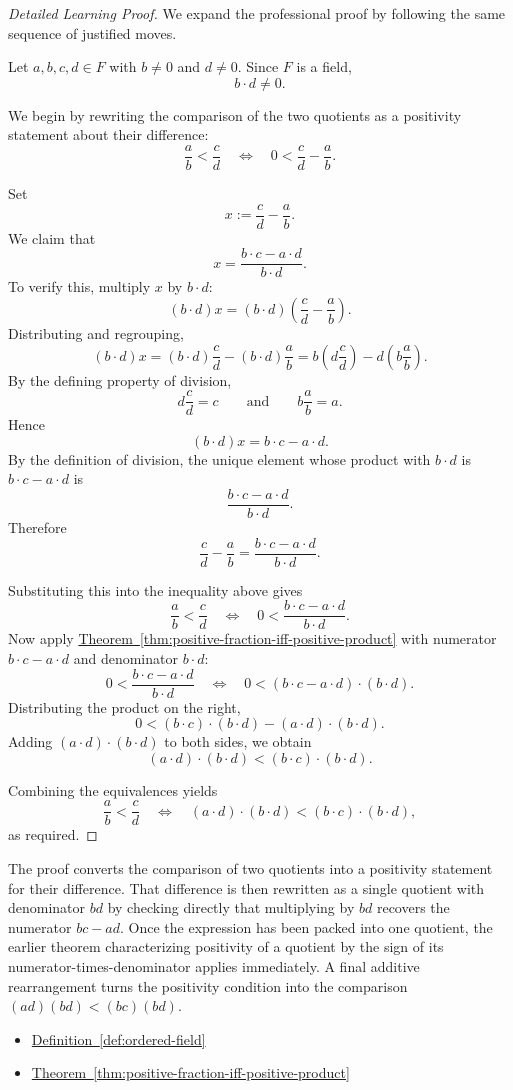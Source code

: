 \begin{proof}[Detailed Learning Proof]
\LRAProofBodyStart
We expand the professional proof by following the same sequence of justified moves.

Let $a,b,c,d\in F$ with $b\neq 0$ and $d\neq 0$.  Since $F$ is a field,
\[
b\cdot d\neq 0.
\]

We begin by rewriting the comparison of the two quotients as a positivity
statement about their difference:
\[
\frac{a}{b}<\frac{c}{d}
\quad\Longleftrightarrow\quad
0<\frac{c}{d}-\frac{a}{b}.
\]

Set
\[
x:=\frac{c}{d}-\frac{a}{b}.
\]
We claim that
\[
x=\frac{b\cdot c-a\cdot d}{b\cdot d}.
\]
To verify this, multiply $x$ by $b\cdot d$:
\[
(b\cdot d)x
=(b\cdot d)\left(\frac{c}{d}-\frac{a}{b}\right).
\]
Distributing and regrouping,
\[
(b\cdot d)x
=(b\cdot d)\frac{c}{d}-(b\cdot d)\frac{a}{b}
=b\left(d\frac{c}{d}\right)-d\left(b\frac{a}{b}\right).
\]
By the defining property of division,
\[
d\frac{c}{d}=c
\qquad\text{and}\qquad
b\frac{a}{b}=a.
\]
Hence
\[
(b\cdot d)x=b\cdot c-a\cdot d.
\]
By the definition of division, the unique element whose product with
$b\cdot d$ is $b\cdot c-a\cdot d$ is
\[
\frac{b\cdot c-a\cdot d}{b\cdot d}.
\]
Therefore
\[
\frac{c}{d}-\frac{a}{b}=\frac{b\cdot c-a\cdot d}{b\cdot d}.
\]

Substituting this into the inequality above gives
\[
\frac{a}{b}<\frac{c}{d}
\quad\Longleftrightarrow\quad
0<\frac{b\cdot c-a\cdot d}{b\cdot d}.
\]
Now apply
\hyperref[thm:positive-fraction-iff-positive-product]{Theorem~\ref*{thm:positive-fraction-iff-positive-product}}
with numerator $b\cdot c-a\cdot d$ and denominator $b\cdot d$:
\[
0<\frac{b\cdot c-a\cdot d}{b\cdot d}
\quad\Longleftrightarrow\quad
0<(b\cdot c-a\cdot d)\cdot(b\cdot d).
\]
Distributing the product on the right,
\[
0<(b\cdot c)\cdot(b\cdot d)-(a\cdot d)\cdot(b\cdot d).
\]
Adding $(a\cdot d)\cdot(b\cdot d)$ to both sides, we obtain
\[
(a\cdot d)\cdot(b\cdot d)<(b\cdot c)\cdot(b\cdot d).
\]

Combining the equivalences yields
\[
\frac{a}{b}<\frac{c}{d}
\quad\Longleftrightarrow\quad
(a\cdot d)\cdot(b\cdot d)<(b\cdot c)\cdot(b\cdot d),
\]
as required.
\end{proof}

\begin{remark*}
The proof converts the comparison of two quotients into a positivity statement
for their difference.  That difference is then rewritten as a single quotient
with denominator $bd$ by checking directly that multiplying by $bd$ recovers
the numerator $bc-ad$.  Once the expression has been packed into one quotient,
the earlier theorem characterizing positivity of a quotient by the sign of its
numerator-times-denominator applies immediately.  A final additive
rearrangement turns the positivity condition into the comparison
$(ad)(bd)<(bc)(bd)$.
\end{remark*}

\begin{dependencies}
\begin{itemize}
  \item \hyperref[def:ordered-field]{Definition~\ref*{def:ordered-field}}
  \item \hyperref[thm:positive-fraction-iff-positive-product]{Theorem~\ref*{thm:positive-fraction-iff-positive-product}}
\end{itemize}
\end{dependencies}

\clearpage
